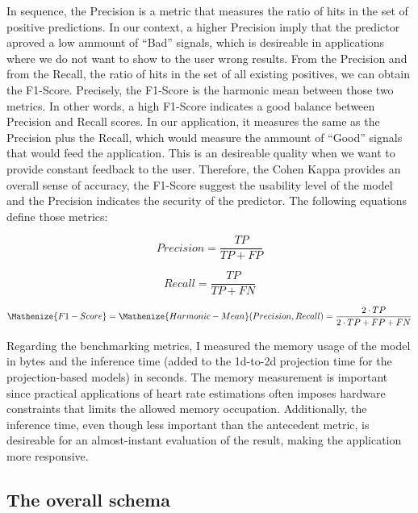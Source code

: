 In sequence, the Precision is a metric that measures the ratio of hits in the set of positive predictions. In our context, a higher Precision imply that the predictor aproved a low ammount of ``Bad'' signals, which is desireable in applications where we do not want to show to the user wrong results. From the Precision and from the Recall, the ratio of hits in the set of all existing positives, we can obtain the F1-Score. Precisely, the F1-Score is the harmonic mean between those two metrics. In other words, a high F1-Score indicates a good balance between Precision and Recall scores. In our application, it measures the same as the Precision plus the Recall, which would measure the ammount of ``Good'' signals that would feed the application. This is an desireable quality when we want to provide constant feedback to the user. Therefore, the Cohen Kappa provides an overall sense of accuracy, the F1-Score suggest the usability level of the model and the Precision indicates the security of the predictor. The following equations define those metrics:

\begin{equation} \label{eq:Precision}
Precision = \frac{TP}{TP+FP}
\end{equation}


\begin{equation} \label{eq:Recall}
Recall = \frac{TP}{TP+FN}
\end{equation}

\begin{equation} \label{eq:F1-Score}
\Mathenize{F1-Score}  = \Mathenize{Harmonic-Mean}(Precision,Recall) = \frac{2 \cdot TP}{2 \cdot TP + FP + FN}
\end{equation}

Regarding the benchmarking metrics, I measured the memory usage of the model in bytes and the inference time (added to the 1d-to-2d projection time for the projection-based models) in seconds. The memory measurement is important since practical applications of heart rate estimations often imposes hardware constraints that limits the allowed memory occupation. Additionally, the inference time, even though less important than the antecedent metric, is desireable for an almost-instant evaluation of the result, making the application more responsive.

\subsection{The overall schema}

